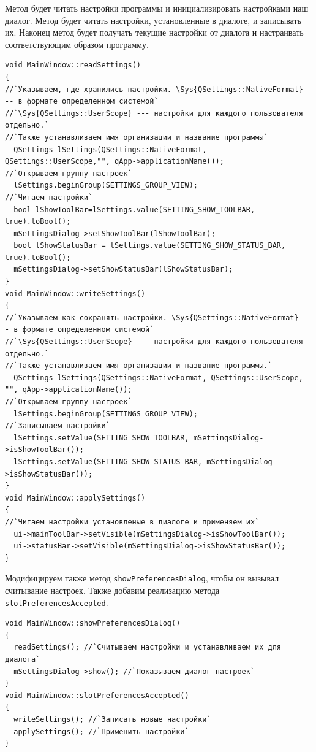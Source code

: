 Метод  будет читать настройки программы и инициализировать настройками наш диалог. Метод
 будет читать настройки, установленные в диалоге, и записывать их. Наконец метод
 будет получать текущие настройки от диалога и настраивать соответствующим образом
программу. 
\begin{lstlisting}
void MainWindow::readSettings()
{
//`Указываем, где хранились настройки. \Sys{QSettings::NativeFormat} --- в формате определенном системой`
//`\Sys{QSettings::UserScope} --- настройки для каждого пользователя отдельно.` 
//`Также устанавливаем имя организации и название программы` 
  QSettings lSettings(QSettings::NativeFormat, QSettings::UserScope,"", qApp->applicationName());
//`Открываем группу настроек` 
  lSettings.beginGroup(SETTINGS_GROUP_VIEW);
//`Читаем настройки` 
  bool lShowToolBar=lSettings.value(SETTING_SHOW_TOOLBAR, true).toBool();
  mSettingsDialog->setShowToolBar(lShowToolBar);
  bool lShowStatusBar = lSettings.value(SETTING_SHOW_STATUS_BAR, true).toBool();
  mSettingsDialog->setShowStatusBar(lShowStatusBar);
}
void MainWindow::writeSettings()
{
//`Указываем как сохранять настройки. \Sys{QSettings::NativeFormat} --- в формате определенном системой`
//`\Sys{QSettings::UserScope} --- настройки для каждого пользователя отдельно.` 
//`Также устанавливаем имя организации и название программы.`
  QSettings lSettings(QSettings::NativeFormat, QSettings::UserScope, "", qApp->applicationName());
//`Открываем группу настроек` 
  lSettings.beginGroup(SETTINGS_GROUP_VIEW);
//`Записываем настройки` 
  lSettings.setValue(SETTING_SHOW_TOOLBAR, mSettingsDialog->isShowToolBar());
  lSettings.setValue(SETTING_SHOW_STATUS_BAR, mSettingsDialog->isShowStatusBar());
}
void MainWindow::applySettings()
{
//`Читаем настройки установленые в диалоге и применяем их`
  ui->mainToolBar->setVisible(mSettingsDialog->isShowToolBar());
  ui->statusBar->setVisible(mSettingsDialog->isShowStatusBar());
}
\end{lstlisting}

Модифицируем также метод \lstinline!showPreferencesDialog!, чтобы он вызывал считывание настроек. Также добавим
реализацию метода \lstinline!slotPreferencesAccepted!. 
\begin{lstlisting}
void MainWindow::showPreferencesDialog()
{
  readSettings(); //`Считываем настройки и устанавливаем их для диалога`
  mSettingsDialog->show(); //`Показываем диалог настроек`
}
void MainWindow::slotPreferencesAccepted()
{
  writeSettings(); //`Записать новые настройки`
  applySettings(); //`Применить настройки`
}
\end{lstlisting}


